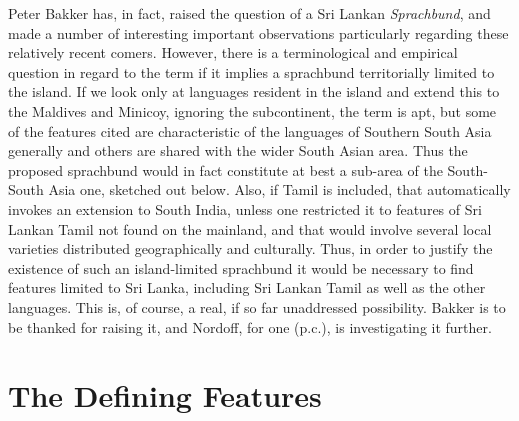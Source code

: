 \documentclass[letterpaper]{article}
\begin{document}
Peter Bakker has, in fact, raised the question of a Sri Lankan \textit{Sprachbund}, and made a number of interesting important observations particularly regarding these relatively recent comers. However, there is a terminological and empirical question in regard to the term if it implies a sprachbund territorially limited to the island. If we look only at languages resident in the island and extend this to the Maldives and Minicoy, ignoring the subcontinent, the term is apt, but some of the features cited are characteristic of the languages of Southern South Asia generally and others are shared with the wider South Asian area. Thus the proposed sprachbund would in fact constitute at best a sub-area of the South-South Asia one, sketched out below. Also, if Tamil is included, that automatically invokes an extension to South India, unless one restricted it to features of Sri Lankan Tamil not found on the mainland, and that would involve several local varieties distributed geographically and culturally. Thus, in order to justify the existence of such an island-limited sprachbund it would be necessary to find features limited to Sri Lanka, including Sri Lankan Tamil as well as the other languages. This is, of course, a real, if so far unaddressed possibility. Bakker is to be thanked for raising it, and Nordoff, for one (p.c.), is investigating it further. 

\section{The Defining Features}
\end{document}
